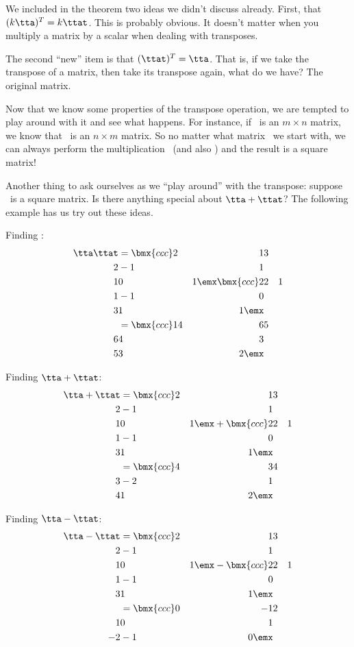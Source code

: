 \smallskip

We included in the theorem two ideas we didn't discuss already. First, that $(k\tta)^T = k\ttat$. This is probably obvious. It doesn't matter when you multiply a matrix by a scalar when dealing with transposes.

The second ``new'' item is that $(\ttat)^T = \tta$. That is, if we take the transpose of a matrix, then take its transpose again, what do we have? The original matrix.

Now that we know some properties of the transpose operation, we are tempted to play around with it and see what happens. For instance, if \tta\ is an $m\times n$ matrix, we know that \ttat\ is an $n\times m$ matrix. So no matter what matrix \tta\ we start with, we can always perform the multiplication \tta\ttat\ (and also \ttat\tta) and the result is a square matrix! 

Another thing to ask ourselves as we ``play around'' with the transpose: suppose \tta\ is a square matrix. Is there anything special about $\tta+\ttat$? The following example has us try out these ideas.\\

\medskip

{Finding \tta\ttat:
\begin{align*}
	\tta\ttat &= \bmx{ccc}2&1&3\\2&-1&1\\1&0&1\emx\bmx{ccc}2&2&1\\1&-1&0\\3&1&1\emx \\					
						&= \bmx{ccc}14 & 6 & 5\\ 6&4&3\\ 5& 3& 2\emx
\end{align*}

Finding $\tta+\ttat$:
\begin{align*}
	\tta+\ttat 	&= \bmx{ccc}2&1&3\\2&-1&1\\1&0&1\emx+\bmx{ccc}2&2&1\\1&-1&0\\3&1&1\emx\\
							&= \bmx{ccc}4&3&4\\3&-2&1\\4&1&2\emx
\end{align*}

Finding $\tta-\ttat$:
\begin{align*}
	\tta-\ttat 	&=	\bmx{ccc}2&1&3\\2&-1&1\\1&0&1\emx-\bmx{ccc}2&2&1\\1&-1&0\\3&1&1\emx\\
						&=	\bmx{ccc} 0&-1&2\\1&0&1\\-2&-1&0\emx
\end{align*}
\ } 

